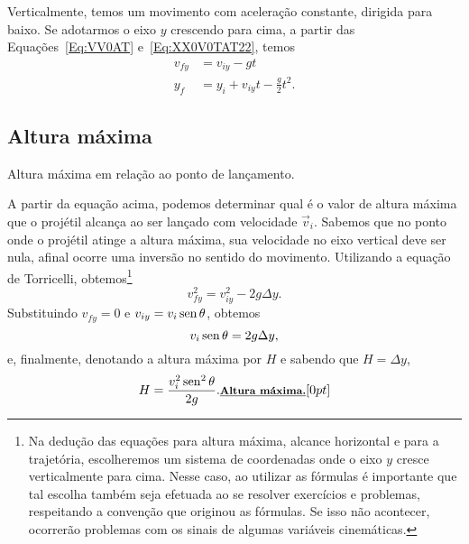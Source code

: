 Verticalmente, temos um movimento com aceleração constante, dirigida para baixo. Se adotarmos o eixo $y$ crescendo para cima, a partir das Equações~\eqref{Eq:VV0AT} e~\eqref{Eq:XX0V0TAT22}, temos
\begin{align}
  v_{fy} &= v_{iy} - gt \\
  y_f &= y_i + v_{iy}t - \frac{g}{2}t^2. \label{Eq:PosYProj}
\end{align}

\subsection{Altura máxima}

\begin{marginfigure}[-7cm]
\centering
{}
\caption{Altura máxima em relação ao ponto de lançamento.}
\end{marginfigure}

A partir da equação acima, podemos determinar qual é o valor de altura máxima que o projétil alcança ao ser lançado com velocidade $\vec{v}_i$. Sabemos que no ponto onde o projétil atinge a altura máxima, sua velocidade no eixo vertical deve ser nula, afinal ocorre uma inversão no sentido do movimento. Utilizando a equação de Torricelli, obtemos\footnote[][-2cm]{Na dedução das equações para altura máxima, alcance horizontal e para a trajetória, escolheremos um sistema de coordenadas onde o eixo $y$ cresce verticalmente para cima. Nesse caso, ao utilizar as fórmulas é importante que tal escolha também seja efetuada ao se resolver exercícios e problemas, respeitando a convenção que originou as fórmulas. Se isso não acontecer, ocorrerão problemas com os sinais de algumas variáveis cinemáticas.}
\begin{equation}
  v_{fy}^2 = v_{iy}^2 - 2 g \Delta y.
\end{equation}
%
Substituindo $v_{fy} = 0$ e $v_{iy} = v_i\operatorname{sen}\theta$, obtemos
\begin{equation}
  v_i\operatorname{sen}\theta = 2g\Delta y,
\end{equation}
%
e, finalmente, denotando a altura máxima por $H$ e sabendo que $H = \Delta y$,
\begin{equation}
  H = \frac{v_i^2\operatorname{sen}^2\theta}{2g}. \relax{\footnotesize\emph{\textbf{Altura máxima.}}}[0pt]
\end{equation}

